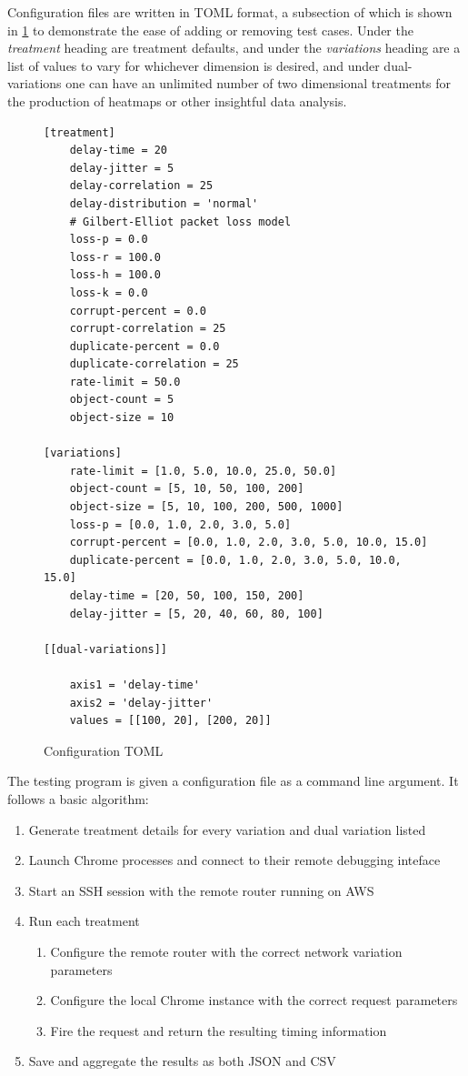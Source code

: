 \documentclass[12pt]{article}
\begin{document}
Configuration files are written in TOML format, a subsection of which is shown in \ref{fig:config} to demonstrate the ease of adding or removing test cases. Under the \textit{treatment} heading are treatment defaults, and under the \textit{variations} heading are a list of values to vary for whichever dimension is desired, and under dual-variations one can have an unlimited number of two dimensional treatments for the production of heatmaps or other insightful data analysis.

\begin{figure}
\begin{lstlisting}
[treatment]
	delay-time = 20
	delay-jitter = 5
	delay-correlation = 25
	delay-distribution = 'normal'
	# Gilbert-Elliot packet loss model
	loss-p = 0.0
	loss-r = 100.0
	loss-h = 100.0
	loss-k = 0.0
	corrupt-percent = 0.0
	corrupt-correlation = 25
	duplicate-percent = 0.0
	duplicate-correlation = 25
	rate-limit = 50.0
	object-count = 5
	object-size = 10

[variations]
	rate-limit = [1.0, 5.0, 10.0, 25.0, 50.0]
	object-count = [5, 10, 50, 100, 200]
	object-size = [5, 10, 100, 200, 500, 1000]
	loss-p = [0.0, 1.0, 2.0, 3.0, 5.0]
	corrupt-percent = [0.0, 1.0, 2.0, 3.0, 5.0, 10.0, 15.0]
	duplicate-percent = [0.0, 1.0, 2.0, 3.0, 5.0, 10.0, 15.0]
	delay-time = [20, 50, 100, 150, 200]
	delay-jitter = [5, 20, 40, 60, 80, 100]

[[dual-variations]]

	axis1 = 'delay-time'
	axis2 = 'delay-jitter'
	values = [[100, 20], [200, 20]]
\end{lstlisting}
\label{fig:config}
\caption{Configuration TOML}
\end{figure}

The testing program is given a configuration file as a command line argument. It follows a basic algorithm:

\begin{enumerate}[topsep=0pt,itemsep=-1ex,partopsep=1ex,parsep=1ex]
	\item Generate treatment details for every variation and dual variation listed
	\item Launch Chrome processes and connect to their remote debugging inteface
	\item Start an SSH session with the remote router running on AWS
	\item Run each treatment
	\begin{enumerate}[topsep=0pt,itemsep=-1ex,partopsep=1ex,parsep=1ex]
		\item Configure the remote router with the correct network variation parameters
		\item Configure the local Chrome instance with the correct request parameters
		\item Fire the request and return the resulting timing information
	\end{enumerate}
	\item Save and aggregate the results as both JSON and CSV
\end{enumerate}
\end{document}
